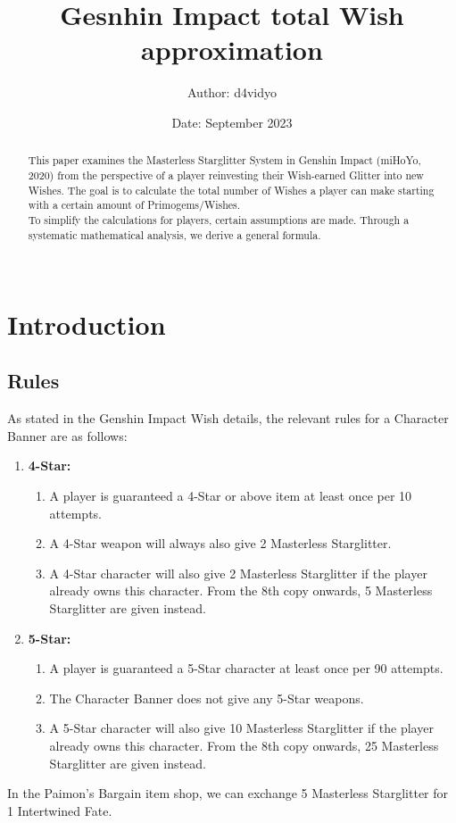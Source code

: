 \documentclass[11pt, a4paper]{article}
\title{Gesnhin Impact total Wish approximation}
\author{Author: d4vidyo\footnotemark[1]}
\date{Date: September 2023}
\begin{document}
\maketitle
\vfill
\begin{abstract}
This paper examines the Masterless Starglitter System in Genshin Impact (miHoYo, 2020) from the perspective of a player reinvesting their Wish-earned Glitter into new Wishes. The goal is to calculate the total number of Wishes a player can make starting with a certain amount of Primogems/Wishes.
\\
To simplify the calculations for players, certain assumptions are made. Through a systematic mathematical analysis, we derive a general formula.
\\
\\
\end{abstract}
\newpage

\tableofcontents
\newpage


\section{Introduction}

\subsection{Rules}
As stated in the Genshin Impact Wish details, the relevant rules for a Character Banner are as follows:
\begin{enumerate}
    \item \textbf{4-Star:}
    \begin{enumerate}
        \item A player is guaranteed a 4-Star or above item at least once per 10 attempts.
        \item A 4-Star weapon will always also give 2 Masterless Starglitter.
        \item A 4-Star character will also give 2 Masterless Starglitter if the player already owns this character. From the 8th copy onwards, 5 Masterless Starglitter are given instead.
    \end{enumerate}

    \item \textbf{5-Star:}
    \begin{enumerate}
        \item A player is guaranteed a 5-Star character at least once per 90 attempts.
        \item The Character Banner does not give any 5-Star weapons.
        \item A 5-Star character will also give 10 Masterless Starglitter if the player already owns this character. From the 8th copy onwards, 25 Masterless Starglitter are given instead.
    \end{enumerate}
\end{enumerate}
In the Paimon's Bargain item shop, we can exchange 5 Masterless Starglitter for 1 Intertwined Fate.
\end{document}
